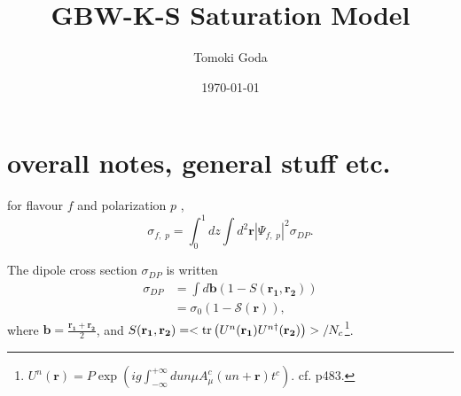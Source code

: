 \documentclass[12pt]{article}
\begin{document}
	
\author{Tomoki Goda}
\title{GBW-K-S Saturation Model}
\date{\today}

\maketitle
	
{}


\section{overall notes, general stuff etc.}

for flavour $f$ and polarization $p$ \cite{cambqcd}\cite{gbw1998},
\begin{equation}
	\sigma_{f,\;p}=\int_{0}^{1} d z \int d^2\mathbf{r}|\Psi_{f,\;p}|^2 \sigma_{DP}.
\end{equation}

The dipole cross section $\sigma_{DP}$ is written \cite{cambqcd}%
\begin{align}
	\sigma_{DP}&=\int d\mathbf{b}(1-S(\mathbf{r_1},\mathbf{r_2})) \\
	&=\sigma_0 (1-\mathcal{S}(\mathbf{r})),
\end{align}
where $\mathbf{b}=\frac{\mathbf{r_1}+\mathbf{r_2}}{2}$, and $S(\mathbf{r_1},\mathbf{r_2}) =<\tr\left( U^n(\mathbf{r_1}) U^{n\dagger}(\mathbf{r_2})\right)>/N_c$\footnote{$U ^n (\mathbf{r})=P \exp\left(i g \int^{+\infty}_{-\infty}du n\mu A^c_\mu (u n+\mathbf{r}) t^c\right)$. cf. \cite{cambqcd} p483.}.








\newpage
\printbibliography
\end{document}
